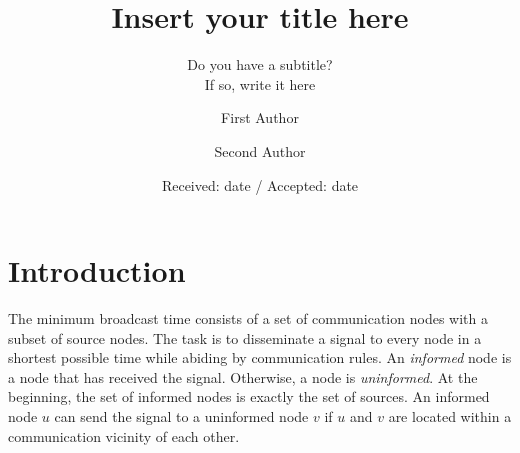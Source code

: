 \title{Insert your title here%
}
\subtitle{Do you have a subtitle?\\ If so, write it here}


\author{First Author         \and
        Second Author %
}



\date{Received: date / Accepted: date}


\maketitle

\begin{abstract}
\keywords{}
\end{abstract}

\section{Introduction}
\label{intro}
The minimum broadcast time consists of a set of communication nodes with a subset of source nodes. 
The task is to disseminate a signal to every node in a shortest possible time while abiding by communication rules.
An \emph{informed} node is a node that has received the signal.
Otherwise, a node is \emph{uninformed}.
At the beginning, the set of informed nodes is exactly the set of sources.
An informed node $u$ can send the signal to a uninformed node $v$ if $u$ and $v$ are located within a communication vicinity of each other.

